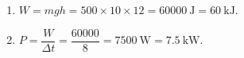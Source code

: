 \documentclass[11pt,a4paper]{article}
\begin{document}
\begin{corrige}
\begin{enumerate}[label=\alph*)]
  \item $W=mgh=500\times10\times12=\qty{60000}{\joule}=\qty{60}{\kilo\joule}$.
  \item $P=\dfrac{W}{\Delta t}=\dfrac{60000}{8}=\qty{7500}{\watt}=\qty{7,5}{\kilo\watt}$.
\end{enumerate}
\end{corrige}
\end{document}
